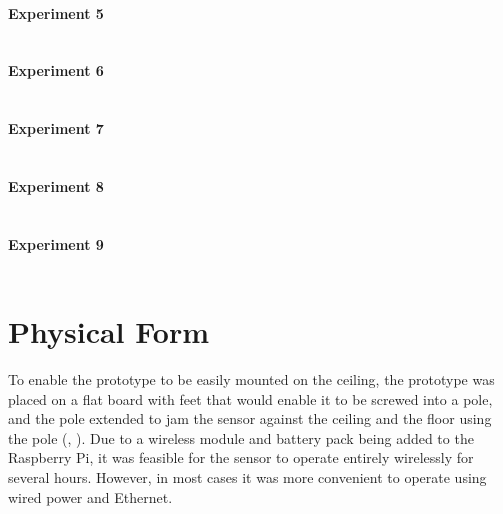 \subsubsection{Experiment 5}
\inputminted[fontsize=\footnotesize,breaklines=true]{text}{../data/processed/third/exp5-balanced.txt}
\clearpage

\subsubsection{Experiment 6}
\inputminted[fontsize=\footnotesize,breaklines=true]{text}{../data/processed/third/exp6-balanced.txt}
\clearpage

\subsubsection{Experiment 7}
\inputminted[fontsize=\footnotesize,breaklines=true]{text}{../data/processed/third/exp7-balanced.txt}
\clearpage

\subsubsection{Experiment 8}
\inputminted[fontsize=\footnotesize,breaklines=true]{text}{../data/processed/third/exp8-balanced.txt}
\clearpage

\subsubsection{Experiment 9}
\inputminted[fontsize=\footnotesize,breaklines=true]{text}{../data/processed/third/exp9-balanced.txt}
\clearpage


\chapter{Physical Form}
To enable the prototype to be easily mounted on the ceiling, the prototype was placed on a flat board with feet that would enable it to be screwed into a pole, and the pole extended to jam the sensor against the ceiling and the floor using the pole (, ). Due to a wireless module and battery pack being added to the Raspberry Pi, it was feasible for the sensor to operate entirely wirelessly for several hours. However, in most cases it was more convenient to operate using wired power and Ethernet.

